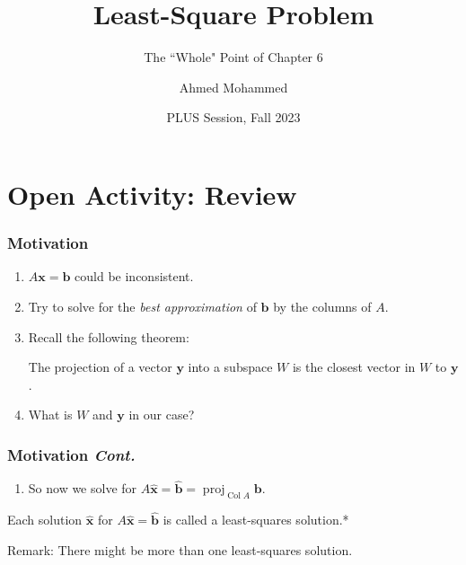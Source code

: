 \documentclass{beamer}
\title{Least-Square Problem}
\subtitle{The ``Whole"  Point of Chapter 6}
\author{Ahmed Mohammed}
\institute{Georgia Institute of Technology}
\date{PLUS Session, Fall 2023}
\renewcommand{\vec}[1]{\bm{#1}}
\DeclareMathOperator{\proj}{proj}
\DeclareMathOperator{\colspace}{Col}
\begin{document}
	\begin{frame}
		\maketitle
	\end{frame}

	\section{Open Activity: Review}
	\begin{frame}
		\frametitle{Motivation}
		\begin{enumerate}[<+(1)->]
			\item \(A\vec{x} = \vec{b}\) could be inconsistent.
			\item Try to solve for the \textit{best approximation} of \(\vec{b}\) by the columns of \(A\).
			\item Recall the following theorem:
				\begin{theorem}
					The projection of a vector \(\vec{y}\) into a subspace \(W\) is the closest vector in \(W\) to \(\vec{y}\).
				\end{theorem}
			\item What is \(W\) and \(\vec{y}\) in our case?
		\end{enumerate}
	\end{frame}

	\begin{frame}
		\frametitle{Motivation \textit{Cont.}}
		 \begin{enumerate}[<+(1)->]
			\item So now we solve for \(A\vec{\hat{x}} = \vec{\hat{b}} = \proj_{\colspace{A}}\vec{b}\).
		\end{enumerate}\pause

			\begin{definition}
				Each solution \(\vec{\hat{x}}\) for \(A\vec{\hat{x}} = \vec{\hat{b}}\) is called a least-squares solution.*
			\end{definition}
			Remark: There might be more than one least-squares solution.
	\end{frame}
\end{document}
